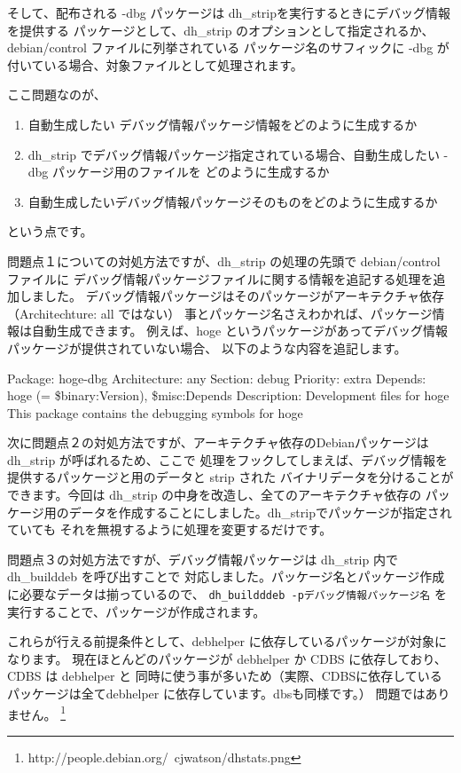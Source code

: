 \documentclass[mingoth,a4paper]{jsarticle}
\begin{document}
そして、配布される -dbg パッケージは dh\_stripを実行するときにデバッグ情報を提供する
パッケージとして、dh\_strip のオプションとして指定されるか、debian/control ファイルに列挙されている
パッケージ名のサフィックに -dbg が付いている場合、対象ファイルとして処理されます。

ここ問題なのが、
\begin{enumerate}
\item 自動生成したい デバッグ情報パッケージ情報をどのように生成するか
\item dh\_strip でデバッグ情報パッケージ指定されている場合、自動生成したい -dbg パッケージ用のファイルを
どのように生成するか
\item 自動生成したいデバッグ情報パッケージそのものをどのように生成するか
\end{enumerate}
という点です。

問題点１についての対処方法ですが、dh\_strip の処理の先頭で debian/control ファイルに
デバッグ情報パッケージファイルに関する情報を追記する処理を追加しました。
デバッグ情報パッケージはそのパッケージがアーキテクチャ依存（Architechture: all ではない）
事とパッケージ名さえわかれば、パッケージ情報は自動生成できます。
例えば、hoge というパッケージがあってデバッグ情報パッケージが提供されていない場合、
以下のような内容を追記します。

\begin{commandline}
Package: hoge-dbg
Architecture: any
Section: debug
Priority: extra
Depends: hoge (= \${binary:Version}), \${misc:Depends}
Description: Development files for hoge
 This package contains the debugging symbols for hoge
\end{commandline}

次に問題点２の対処方法ですが、アーキテクチャ依存のDebianパッケージは dh\_strip が呼ばれるため、ここで
処理をフックしてしまえば、デバッグ情報を提供するパッケージと用のデータと strip された
バイナリデータを分けることができます。今回は dh\_strip の中身を改造し、全てのアーキテクチャ依存の
パッケージ用のデータを作成することにしました。dh\_stripでパッケージが指定されていても
それを無視するように処理を変更するだけです。

問題点３の対処方法ですが、デバッグ情報パッケージは dh\_strip 内で dh\_builddeb を呼び出すことで
対応しました。パッケージ名とパッケージ作成に必要なデータは揃っているので、
\texttt{dh\_buildddeb -pデバッグ情報パッケージ名} を実行することで、パッケージが作成されます。

これらが行える前提条件として、debhelper に依存しているパッケージが対象になります。
現在ほとんどのパッケージが debhelper か CDBS に依存しており、CDBS は debhelper と
同時に使う事が多いため（実際、CDBSに依存しているパッケージは全てdebhelper に依存しています。dbsも同様です。）
問題ではありません。
\footnote{http://people.debian.org/~cjwatson/dhstats.png}
\end{document}
